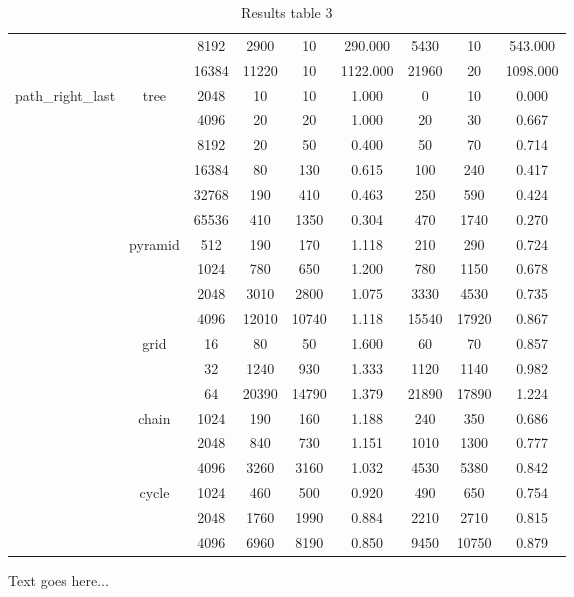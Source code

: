 \begin{table}
{\begin{tabular}{c|c|c|c|c|c|c|c|c}
   &  &  8192 &  2900 & 10 &  290.000  & 5430 & 10 &  543.000 \\
   &  &  16384 &  11220 & 10 &  1122.000  & 21960 & 20 &  1098.000 \\
   \cline{2-9}
   \hline
   \multirow{19}{*}{path\_right\_last} &  \multirow{6}{*}{tree} &  2048 &  10 & 10 &  1.000  & 0 & 10 &  0.000 \\
   &  &  4096 &  20 & 20 &  1.000  & 20 & 30 &  0.667 \\
   &  &  8192 &  20 & 50 &  0.400  & 50 & 70 &  0.714 \\
   &  &  16384 &  80 & 130 &  0.615  & 100 & 240 &  0.417 \\
   &  &  32768 &  190 & 410 &  0.463  & 250 & 590 &  0.424 \\
   &  &  65536 &  410 & 1350 &  0.304  & 470 & 1740 &  0.270 \\
   \cline{2-9}
   &  \multirow{4}{*}{pyramid} &  512 &  190 & 170 &  1.118  & 210 & 290 &  0.724 \\
   &  &  1024 &  780 & 650 &  1.200  & 780 & 1150 &  0.678 \\
   &  &  2048 &  3010 & 2800 &  1.075  & 3330 & 4530 &  0.735 \\
   &  &  4096 &  12010 & 10740 &  1.118  & 15540 & 17920 &  0.867 \\
   \cline{2-9}
   &  \multirow{3}{*}{grid} &  16 &  80 & 50 &  1.600  & 60 & 70 &  0.857 \\
   &  &  32 &  1240 & 930 &  1.333  & 1120 & 1140 &  0.982 \\
   &  &  64 &  20390 & 14790 &  1.379  & 21890 & 17890 &  1.224 \\
   \cline{2-9}
   &  \multirow{3}{*}{chain} &  1024 &  190 & 160 &  1.188  & 240 & 350 &  0.686 \\
   &  &  2048 &  840 & 730 &  1.151  & 1010 & 1300 &  0.777 \\
   &  &  4096 &  3260 & 3160 &  1.032  & 4530 & 5380 &  0.842 \\
   \cline{2-9}
   &  \multirow{3}{*}{cycle} &  1024 &  460 & 500 &  0.920  & 490 & 650 &  0.754 \\
   &  &  2048 &  1760 & 1990 &  0.884  & 2210 & 2710 &  0.815 \\
   &  &  4096 &  6960 & 8190 &  0.850  & 9450 & 10750 &  0.879 \\
   \cline{2-9}
   \hline
\end{tabular}
}
\caption{Results table 3}
\end{table}

Text goes here...